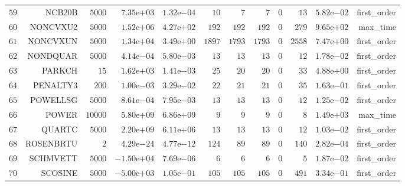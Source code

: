 \begin{longtable}{rrrrrrrrrrrr}
  \(    59\) & NCB20B & \(  5000\) & \( 7.35\)e\(+03\) & \( 1.32\)e\(-04\) & \(    10\) & \(     7\) & \(     7\) & \(     0\) & \(    13\) & \( 5.82\)e\(-02\) & first\_order \\
  \(    60\) & NONCVXU2 & \(  5000\) & \( 1.52\)e\(+06\) & \( 4.27\)e\(+02\) & \(   192\) & \(   192\) & \(   192\) & \(     0\) & \(   279\) & \( 9.65\)e\(+02\) & max\_time \\
  \(    61\) & NONCVXUN & \(  5000\) & \( 1.34\)e\(+04\) & \( 3.49\)e\(+00\) & \(  1897\) & \(  1793\) & \(  1793\) & \(     0\) & \(  2558\) & \( 7.47\)e\(+00\) & first\_order \\
  \(    62\) & NONDQUAR & \(  5000\) & \( 4.14\)e\(-04\) & \( 5.80\)e\(-03\) & \(    13\) & \(    13\) & \(    13\) & \(     0\) & \(    12\) & \( 1.78\)e\(-02\) & first\_order \\
  \(    63\) & PARKCH & \(    15\) & \( 1.62\)e\(+03\) & \( 1.41\)e\(-03\) & \(    25\) & \(    20\) & \(    20\) & \(     0\) & \(    33\) & \( 4.88\)e\(+00\) & first\_order \\
  \(    64\) & PENALTY3 & \(   200\) & \( 1.00\)e\(-03\) & \( 3.29\)e\(-02\) & \(    22\) & \(    21\) & \(    21\) & \(     0\) & \(    35\) & \( 1.63\)e\(-01\) & first\_order \\
  \(    65\) & POWELLSG & \(  5000\) & \( 8.61\)e\(-04\) & \( 7.95\)e\(-03\) & \(    13\) & \(    13\) & \(    13\) & \(     0\) & \(    12\) & \( 1.25\)e\(-02\) & first\_order \\
  \(    66\) & POWER & \( 10000\) & \( 5.80\)e\(+09\) & \( 6.86\)e\(+09\) & \(     9\) & \(     9\) & \(     9\) & \(     0\) & \(     8\) & \( 1.49\)e\(+03\) & max\_time \\
  \(    67\) & QUARTC & \(  5000\) & \( 2.20\)e\(+09\) & \( 6.11\)e\(+06\) & \(    13\) & \(    13\) & \(    13\) & \(     0\) & \(    12\) & \( 1.03\)e\(-02\) & first\_order \\
  \(    68\) & ROSENBRTU & \(     2\) & \( 4.29\)e\(-24\) & \( 4.77\)e\(-12\) & \(   124\) & \(    89\) & \(    89\) & \(     0\) & \(   140\) & \( 2.82\)e\(-04\) & first\_order \\
  \(    69\) & SCHMVETT & \(  5000\) & \(-1.50\)e\(+04\) & \( 7.69\)e\(-06\) & \(     6\) & \(     6\) & \(     6\) & \(     0\) & \(     5\) & \( 1.87\)e\(-02\) & first\_order \\
  \(    70\) & SCOSINE & \(  5000\) & \(-5.00\)e\(+03\) & \( 1.05\)e\(-01\) & \(   105\) & \(   105\) & \(   105\) & \(     0\) & \(   491\) & \( 3.34\)e\(-01\) & first\_order \\

\end{longtable}
